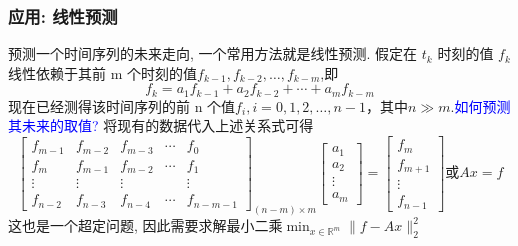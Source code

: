 \documentclass[12pt,a4paper]{article}
\begin{document}
\subsubsection{应用: 线性预测}
预测一个时间序列的未来走向, 一个常用方法就是线性预测. 假定在 $t_{k}$ 时刻的值 $f_{k}$ 线性依赖于其前 m 个时刻的值$f_{k-1}, f_{k-2}, \dots, f_{k-m}$,即
\begin{equation}
f_{k}=a_{1} f_{k-1}+a_{2} f_{k-2}+\cdots+a_{m} f_{k-m}
\end{equation}
现在已经测得该时间序列的前 n 个值$f_{i}, i=0,1,2, \ldots, n-1$，其中$n \gg m$.\textcolor{blue}{如何预测其未来的取值?}
将现有的数据代入上述关系式可得
$$
\left[\begin{array}{ccccc}
{f_{m-1}} & {f_{m-2}} & {f_{m-3}} & {\cdots} & {f_{0}} \\
{f_{m}} & {f_{m-1}} & {f_{m-2}} & {\cdots} & {f_{1}} \\ 
{\vdots} & {\vdots} & {\vdots} & {} & {\vdots} \\ 
{f_{n-2}} & {f_{n-3}} & {f_{n-4}} & {\cdots} & {f_{n-m-1}}
\end{array}\right]_{(n-m) \times m}\left[\begin{array}{c}
{a_{1}} \\
{a_{2}} \\
{\vdots} \\ 
{a_{m}}
\end{array}\right]=\left[\begin{array}{c}
{f_{m}} \\ 
{f_{m+1}} \\ 
{\vdots} \\ 
{f_{n-1}}
\end{array}\right]或A x=f
$$
这也是一个超定问题, 因此需要求解最小二乘$\min _{x \in \mathbb{R}^{m}}\|f-A x\|_{2}^{2}$
\end{document}
